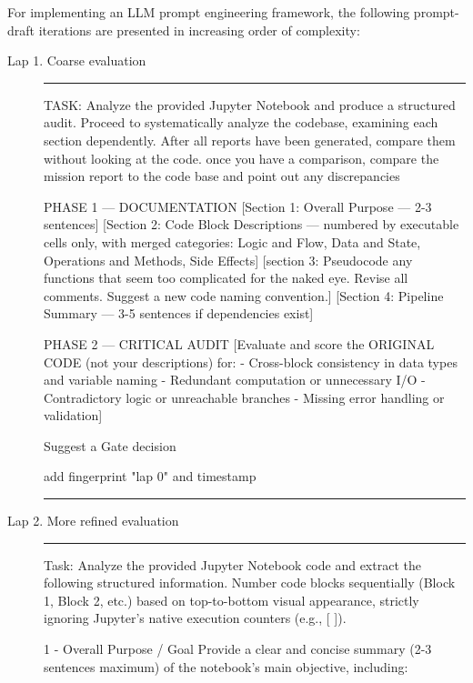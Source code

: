 \documentclass[11pt, a4paper]{article}
\begin{document}
For implementing an LLM prompt engineering framework, the following prompt-draft iterations are presented in increasing order of complexity:
\begin{description}
	\item[Lap 1. Coarse evaluation]\;  
	
\vspace{.3cm}
\rule{\textwidth}{0.3pt}

{\small\sffamily
TASK: Analyze the provided Jupyter Notebook and produce a structured audit. Proceed to systematically analyze the codebase, examining each section dependently. After all reports have been generated, compare them without looking at the code. 
once you have a comparison, compare the mission report to the code base and point out any discrepancies

PHASE 1 — DOCUMENTATION
[Section 1: Overall Purpose — 2-3 sentences]
[Section 2: Code Block Descriptions — numbered by executable cells only, 
with merged categories: Logic and Flow, Data and State, 
Operations and Methods, Side Effects]
[section 3: Pseudocode any functions that seem too complicated for the naked eye. Revise all comments. Suggest a new code naming convention.]
[Section 4: Pipeline Summary — 3-5 sentences if dependencies exist]

PHASE 2 — CRITICAL AUDIT
[Evaluate and score the ORIGINAL CODE (not your descriptions) for:
- Cross-block consistency in data types and variable naming
- Redundant computation or unnecessary I/O
- Contradictory logic or unreachable branches
- Missing error handling or validation]

Suggest a Gate decision	

add fingerprint "lap 0" and timestamp
}

\rule{\textwidth}{0.3pt}

\vspace{.3cm}
	\item[Lap 2. More  refined evaluation]\;  

\vspace{.3cm}
\rule{\textwidth}{0.3pt}

{\small\sffamily
Task: Analyze the provided Jupyter Notebook code and extract the following structured information. Number code blocks sequentially (Block 1, Block 2, etc.) based on top-to-bottom visual appearance, strictly ignoring Jupyter's native execution counters (e.g., [ ]).
	
	1 - Overall Purpose / Goal
	Provide a clear and concise summary (2-3 sentences maximum) of the notebook’s main objective, including:
	
}
\end{description}
\end{document}
